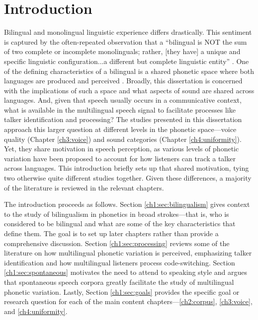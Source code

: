 
\chapter{Introduction}\label{ch:Introduction}

Bilingual and monolingual linguistic experience differs drastically. This sentiment is captured by the often-repeated observation that a ``bilingual is NOT the sum of two complete or incomplete monolinguals; rather, [they have] a unique and specific linguistic configuration...a different but complete linguistic entity'' \citep[][p. 6]{grosjean_1989_bilingual}. One of the defining characteristics of a bilingual is a shared phonetic space where both languages are produced and perceived \citep{flege_2021_slmr}. Broadly, this dissertation is concerned with the implications of such a space and what aspects of sound are shared across languages. And, given that speech usually occurs in a communicative context, what is available in the multilingual speech signal to facilitate processes like talker identification and processing? The studies presented in this dissertation approach this larger question at different levels in the phonetic space---voice quality (Chapter \ref{ch3:voice}) and sound categories (Chapter \ref{ch4:uniformity}). Yet, they share motivation in speech perception, as various levels of phonetic variation have been proposed to account for how listeners can track a talker across languages. This introduction briefly sets up that shared motivation, tying two otherwise quite different studies together. Given these differences, a majority of the literature is reviewed in the relevant chapters. 

The introduction proceeds as follows. Section \ref{ch1:sec:bilingualism} gives context to the study of bilingualism in phonetics in broad strokes---that is, who is considered to be bilingual and what are some of the key characteristics that define them. The goal is to set up later chapters rather than provide a comprehensive discussion. Section \ref{ch1:sec:processing} reviews some of the literature on how multilingual phonetic variation is perceived, emphasizing talker identification and how multilingual listeners process code-switching. Section \ref{ch1:sec:spontaneous} motivates the need to attend to speaking style and argues that spontaneous speech corpora greatly facilitate the study of multilingual phonetic variation. Lastly, Section \ref{ch1:sec:goals} provides the specific goal or research question for each of the main content chapters---\ref{ch2:corpus}, \ref{ch3:voice}, and \ref{ch4:uniformity}.


